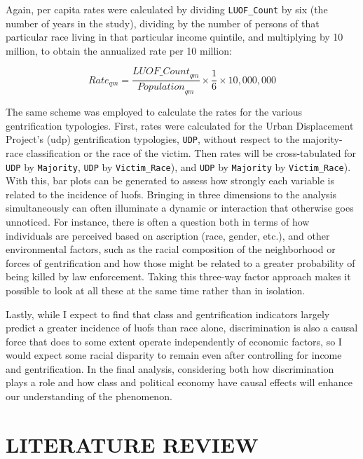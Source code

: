 \documentclass[12pt]{article}
\begin{document}
Again, per capita rates were calculated by dividing \texttt{LUOF\_Count} by six (the number of years in the study), dividing by the number of persons of that particular race living in that particular income quintile, and multiplying by 10 million, to obtain the annualized rate per 10 million:

\begin{equation}
{Rate}_{qm}=\frac{{LUOF\_Count}_{qm}}{{Population}_{qm}}\times\frac{1}{6}\times10,000,000
\label{eq:quintile_majority_rate}
\end{equation}

The same scheme was employed to calculate the rates for the various gentrification typologies. First, rates were calculated for the Urban Displacement Project’s (\acrshort{udp}) gentrification typologies, \texttt{UDP}, without respect to the majority-race classification or the race of the victim. Then rates will be cross-tabulated for \texttt{UDP} by \texttt{Majority}, \texttt{UDP} by \texttt{Victim\_Race}), and \texttt{UDP} by \texttt{Majority} by \texttt{Victim\_Race}). With this, bar plots can be generated to assess how strongly each variable is related to the incidence of \acrshort{luof}s. Bringing in three dimensions to the analysis simultaneously can often illuminate a dynamic or interaction that otherwise goes unnoticed. For instance, there is often a question both in terms of how individuals are perceived based on ascription (race, gender, etc.), and other environmental factors, such as the racial composition of the neighborhood or forces of gentrification and how those might be related to a greater probability of being killed by law enforcement. Taking this three-way factor approach makes it possible to look at all these at the same time rather than in isolation.

Lastly, while I expect to find that class and gentrification indicators largely predict a greater incidence of \acrshort{luof}s than race alone, discrimination is also a causal force that does to some extent operate independently of economic factors, so I would expect some racial disparity to remain even after controlling for income and gentrification. In the final analysis, considering both how discrimination plays a role and how class and political economy have causal effects will enhance our understanding of the phenomenon.

\part{LITERATURE REVIEW}\
\end{document}
